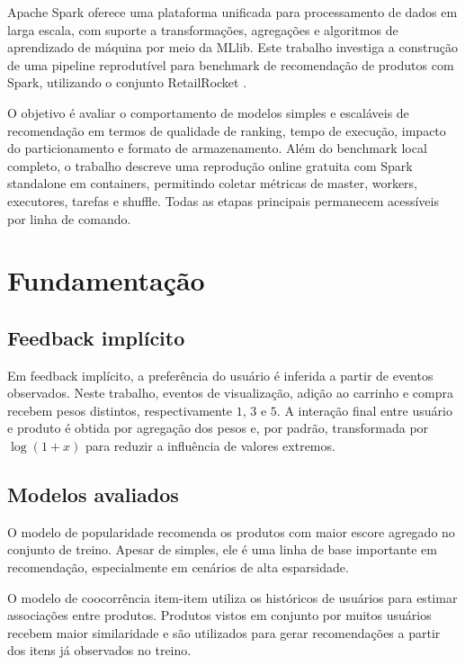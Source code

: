 \documentclass[12pt]{article}
\begin{document}
Apache Spark \cite{zaharia2016spark} oferece uma plataforma unificada para
processamento de dados em larga escala, com suporte a transforma\c{c}\~oes,
agrega\c{c}\~oes e algoritmos de aprendizado de m\'aquina por meio da MLlib.
Este trabalho investiga a constru\c{c}\~ao de uma pipeline reprodut\'ivel para
benchmark de recomenda\c{c}\~ao de produtos com Spark, utilizando o conjunto
RetailRocket \cite{retailrocket2015dataset}.

O objetivo \'e avaliar o comportamento de modelos simples e escal\'aveis de
recomenda\c{c}\~ao em termos de qualidade de ranking, tempo de execu\c{c}\~ao,
impacto do particionamento e formato de armazenamento. Al\'em do benchmark
local completo, o trabalho descreve uma reprodu\c{c}\~ao online gratuita com
Spark standalone em containers, permitindo coletar m\'etricas de master,
workers, executores, tarefas e shuffle. Todas as etapas principais permanecem
acess\'iveis por linha de comando.

\section{Fundamenta\c{c}\~ao}

\subsection{Feedback impl\'icito}

Em feedback impl\'icito, a prefer\^encia do usu\'ario \'e inferida a partir de
eventos observados. Neste trabalho, eventos de visualiza\c{c}\~ao,
adi\c{c}\~ao ao carrinho e compra recebem pesos distintos, respectivamente
$1$, $3$ e $5$. A intera\c{c}\~ao final entre usu\'ario e produto \'e obtida por
agrega\c{c}\~ao dos pesos e, por padr\~ao, transformada por $\log(1+x)$ para
reduzir a influ\^encia de valores extremos.

\subsection{Modelos avaliados}

O modelo de popularidade recomenda os produtos com maior escore agregado no
conjunto de treino. Apesar de simples, ele \'e uma linha de base importante em
recomenda\c{c}\~ao, especialmente em cen\'arios de alta esparsidade.

O modelo de coocorr\^encia item-item utiliza os hist\'oricos de usu\'arios para
estimar associa\c{c}\~oes entre produtos. Produtos vistos em conjunto por muitos
usu\'arios recebem maior similaridade e s\~ao utilizados para gerar
recomenda\c{c}\~oes a partir dos itens j\'a observados no treino.
\end{document}

